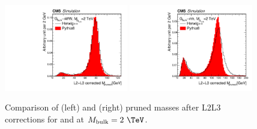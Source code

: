 

\begin{figure}[h]
\centering
\includegraphics[width=0.48\textwidth]{figures/prunedM_WW-M2000.pdf}
\includegraphics[width=0.48\textwidth]{figures/prunedM_hh-M2000.pdf}\\
\caption{Comparison of \PW (left) and \Ph (right) pruned masses after L2L3 
corrections for \PYTHIA and \HERWIG at $M_\mathrm{bulk}=2~\TeV$.}
\label{fig:Masses_PYHG}
\end{figure}


